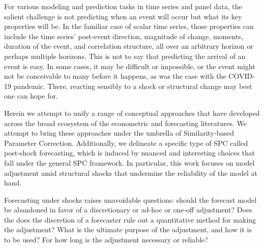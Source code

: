 \documentclass[11pt]{article}
\theoremstyle{definition}
\begin{document}
For various modeling and prediction tasks in time series and panel data, the salient challenge is not predicting when an event will occur but what its key properties will be.  In the familiar case of scalar time series, those properties can include the time series' post-event direction, magnitude of change, moments, duration of the event, and correlation structure, all over an arbitrary horizon or perhaps multiple horizons. This is not to say that predicting the arrival of an event is easy. In some cases, it may be difficult or impossible, or the event might not be conceivable to many before it happens, as was the case with the COVID-19 pandemic.  There, reacting sensibly to a shock or structural change may best one can hope for. 

Herein we attempt to unify a range of conceptual approaches that have developed across the broad ecosystem of the econometric and forecasting literatures.  We attempt to bring these approaches under the umbrella of Similarity-based Parameter Correction.  Additionally, we delineate a specific type of SPC called post-shock forecasting, which is induced by nuanced and interesting choices that fall under the general SPC framework.  In particular, this work focuses on model adjustment amid structural shocks that undermine the reliability of the  model at hand.  

Forecasting under shocks raises unavoidable questions: should the forecast model be abandoned in favor of a discretionary or ad-hoc or one-off adjustment?  Does the does the discretion of a forecaster rule out a quantitative method for making the adjustment?  What is the ultimate purpose of the adjustment, and how it is to be used?  For how long is the adjustment necessary or reliable?
\end{document}
